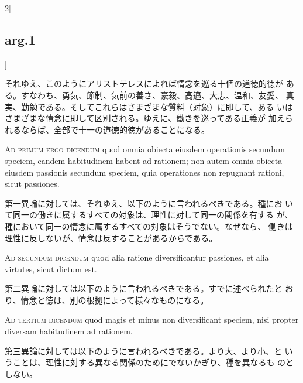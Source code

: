 \documentclass[paper=a4paper,fontsize=10pt,jafontsize=9pt,titlepage]{jlreq}
\begin{document}
\begin{paracol}{2}[\subsection{arg.1}]
\switchcolumn

それゆえ、このようにアリストテレスによれば情念を巡る十個の道徳的徳が
 ある。すなわち、勇気、節制、気前の善さ、豪毅、高邁、大志、温和、友愛、
 真実、勤勉である。そしてこれらはさまざまな質料（対象）に即して、ある
 いはさまざまな情念に即して区別される。ゆえに、働きを巡ってある正義が
 加えられるならば、全部で十一の道徳的徳があることになる。

\switchcolumn*[\subsection{ad.1}]

{\scshape Ad primum ergo dicendum} quod omnia obiecta eiusdem
 operationis secundum speciem, eandem habitudinem habent ad rationem;
 non autem omnia obiecta eiusdem passionis secundum speciem, quia
 operationes non repugnant rationi, sicut passiones.

\switchcolumn

第一異論に対しては、それゆえ、以下のように言われるべきである。種にお
 いて同一の働きに属するすべての対象は、理性に対して同一の関係を有する
 が、種において同一の情念に属するすべての対象はそうでない。なぜなら、
 働きは理性に反しないが、情念は反することがあるからである。

\switchcolumn*[\subsection{ad.2}]

{\scshape Ad secundum dicendum} quod alia ratione diversificantur
 passiones, et alia virtutes, sicut dictum est.

\switchcolumn

第二異論に対しては以下のように言われるべきである。すでに述べられたと
 おり、情念と徳は、別の根拠によって様々なものになる。

\switchcolumn*[\subsection{ad.3}]

{\scshape Ad tertium dicendum} quod magis et minus non diversificant
 speciem, nisi propter diversam habitudinem ad rationem.

\switchcolumn

第三異論に対しては以下のように言われるべきである。より大、より小、と
 いうことは、理性に対する異なる関係のためにでないかぎり、種を異なるも
 のとしない。

\switchcolumn*[\subsection{ad.4}]


\end{paracol}
\end{document}
